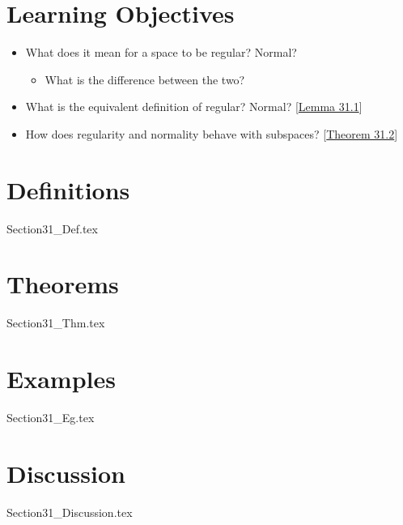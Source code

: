 \section{Learning Objectives}

\begin{itemize}
    \item What does it mean for a space to be regular? Normal?
        \begin{itemize}
            \item What is the difference between the two?
        \end{itemize}
    \item What is the equivalent definition of regular? Normal?
        [\hyperlink{lem:31.1}{Lemma 31.1}]
    \item How does regularity and normality behave with subspaces?
        [\hyperlink{thm:31.2}{Theorem 31.2}]
\end{itemize}

\section{Definitions}

{Section31_Def.tex}

\section{Theorems}

{Section31_Thm.tex}

\section{Examples}

{Section31_Eg.tex}

\section{Discussion}

{Section31_Discussion.tex}